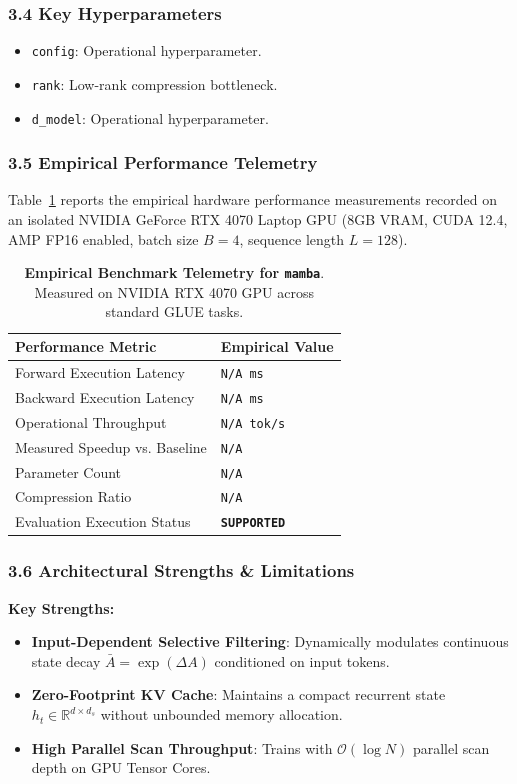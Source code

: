 \subsubsection*{3.4 Key Hyperparameters}
\begin{itemize}
    \item \texttt{config}: Operational hyperparameter.
    \item \texttt{rank}: Low-rank compression bottleneck.
    \item \texttt{d\_model}: Operational hyperparameter.
\end{itemize}

\subsubsection*{3.5 Empirical Performance Telemetry}
Table~\ref{tab:telemetry_mamba} reports the empirical hardware performance measurements recorded on an isolated NVIDIA GeForce RTX 4070 Laptop GPU (8GB VRAM, CUDA 12.4, AMP FP16 enabled, batch size $B=4$, sequence length $L=128$).

\begin{table}[h]
\centering
\small
\caption{\textbf{Empirical Benchmark Telemetry for \texttt{mamba}}. Measured on NVIDIA RTX 4070 GPU across standard GLUE tasks.}
\label{tab:telemetry_mamba}
\begin{tabularx}{\columnwidth}{lX}
\toprule
\textbf{Performance Metric} & \textbf{Empirical Value} \\
\midrule
Forward Execution Latency & \texttt{N/A ms} \\
Backward Execution Latency & \texttt{N/A ms} \\
Operational Throughput & \texttt{N/A tok/s} \\
Measured Speedup vs. Baseline & \texttt{N/A} \\
Parameter Count & \texttt{N/A} \\
Compression Ratio & \texttt{N/A} \\
Evaluation Execution Status & \textbf{\texttt{SUPPORTED}} \\
\bottomrule
\end{tabularx}
\end{table}

\subsubsection*{3.6 Architectural Strengths \& Limitations}
\textbf{Key Strengths:}
\begin{itemize}
    \item \textbf{Input-Dependent Selective Filtering}: Dynamically modulates continuous state decay $\bar{A} = \exp(\Delta A)$ conditioned on input tokens.
    \item \textbf{Zero-Footprint KV Cache}: Maintains a compact recurrent state $h_t \in \mathbb{R}^{d \times d_s}$ without unbounded memory allocation.
    \item \textbf{High Parallel Scan Throughput}: Trains with $\mathcal{O}(\log N)$ parallel scan depth on GPU Tensor Cores.
\end{itemize}

